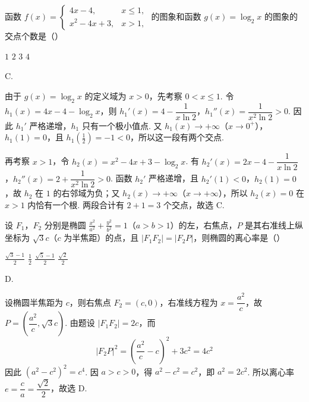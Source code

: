 \begin{problem}
函数 \( f(x) = \begin{cases}
4x - 4, & x \leqslant 1,
\\
x^2 - 4x + 3, & x > 1,
\end{cases} \) 的图象和函数 \( g(x) = \log_2 x \) 的图象的交点个数是（\quad）

\choices
    {\(1\)}
    {\(2\)}
    {\(3\)}
    {\(4\)}
\end{problem}

\begin{answer}
C.
\end{answer}

\begin{solution}
由于 \(g(x)=\log_{2}x\) 的定义域为 \(x>0\)，先考察 \(0<x\leqslant1\). 令
\(h_{1}(x)=4x-4-\log_{2}x\)，则
\(h_{1}'(x)=4-\dfrac1{x\ln2}\)，\(h_{1}''(x)=\dfrac1{x^{2}\ln2}>0\). 因此 \(h_{1}'\) 严格递增，\(h_{1}\) 只有一个极小值点. 又 \(h_{1}(x)\to+\infty\)（\(x\to0^{+}\)），\(h_{1}(1)=0\)，且 \(h_{1}\left(\frac12\right)=-1<0\)，所以这一段有两个交点.

再考察 \(x>1\)，令 \(h_{2}(x)=x^{2}-4x+3-\log_{2}x\). 有
\(h_{2}'(x)=2x-4-\dfrac1{x\ln2}\)，\(h_{2}''(x)=2+\dfrac1{x^{2}\ln2}>0\). 函数 \(h_{2}'\) 严格递增，且 \(h_{2}'(1)<0\)，\(h_{2}(1)=0\)，故 \(h_{2}\) 在 \(1\) 的右邻域为负；又 \(h_{2}(x)\to+\infty\)（\(x\to+\infty\)），所以 \(h_{2}(x)=0\) 在 \(x>1\) 内恰有一个根. 两段合计有 \(2+1=3\) 个交点，故选 C.
\end{solution}

\begin{problem}
设 \(F_{1}\)，\(F_{2}\) 分别是椭圆 \(\frac{x^{2}}{a^{2}} + \frac{y^{2}}{b^{2}} = 1\)（\(a > b > 1\)）的左，右焦点，\(P\) 是其右准线上纵坐标为 \(\sqrt{3} c\)（\(c\) 为半焦距）的点，且 \(|F_{1}F_{2}| = |F_{2}P|\)，则椭圆的离心率是（\quad）

\choices
    {\(\frac{\sqrt{3} - 1}{2}\)}
    {\(\frac{1}{2}\)}
    {\(\frac{\sqrt{5} - 1}{2}\)}
    {\(\frac{\sqrt{2}}{2}\)}
\end{problem}

\begin{answer}
D.
\end{answer}

\begin{solution}
设椭圆半焦距为 \(c\)，则右焦点 \(F_{2}=(c,0)\)，右准线方程为 \(x=\dfrac{a^{2}}c\)，故 \(P=\left(\dfrac{a^{2}}c,\sqrt3c\right)\). 由题设 \(|F_{1}F_{2}|=2c\)，而
\[
|F_{2}P|^{2}=\left(\frac{a^{2}}c-c\right)^{2}+3c^{2}=4c^{2}
\]
因此 \((a^{2}-c^{2})^{2}=c^{4}\). 因 \(a>c>0\)，得 \(a^{2}-c^{2}=c^{2}\)，即 \(a^{2}=2c^{2}\). 所以离心率
\(e=\dfrac ca=\dfrac{\sqrt2}{2}\)，故选 D.
\end{solution}

